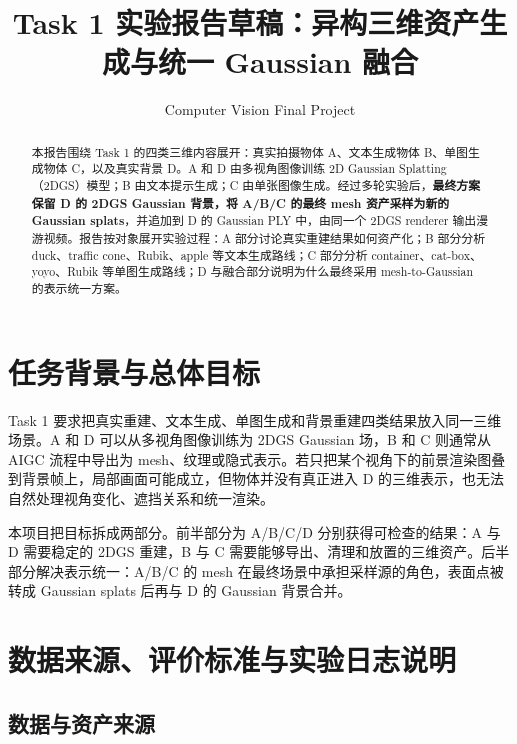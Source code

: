\documentclass[UTF8,10pt,a4paper]{ctexart}
\title{\vspace{-1.0em}\textbf{Task 1 实验报告草稿：异构三维资产生成与统一 Gaussian 融合}}
\author{Computer Vision Final Project}
\date{\vspace{-1.5em}}
\begin{document}
\maketitle
\vspace{-1.0em}


\begin{abstract}
本报告围绕 Task 1 的四类三维内容展开：真实拍摄物体 A、文本生成物体 B、单图生成物体 C，以及真实背景 D。A 和 D 由多视角图像训练 2D Gaussian Splatting（2DGS）模型；B 由文本提示生成；C 由单张图像生成。经过多轮实验后，\textbf{最终方案保留 D 的 2DGS Gaussian 背景，将 A/B/C 的最终 mesh 资产采样为新的 Gaussian splats}，并追加到 D 的 Gaussian PLY 中，由同一个 2DGS renderer 输出漫游视频。报告按对象展开实验过程：A 部分讨论真实重建结果如何资产化；B 部分分析 duck、traffic cone、Rubik、apple 等文本生成路线；C 部分分析 container、cat-box、yoyo、Rubik 等单图生成路线；D 与融合部分说明为什么最终采用 mesh-to-Gaussian 的表示统一方案。
\end{abstract}

\section{任务背景与总体目标}

Task 1 要求把真实重建、文本生成、单图生成和背景重建四类结果放入同一三维场景。A 和 D 可以从多视角图像训练为 2DGS Gaussian 场，B 和 C 则通常从 AIGC 流程中导出为 mesh、纹理或隐式表示。若只把某个视角下的前景渲染图叠到背景帧上，局部画面可能成立，但物体并没有真正进入 D 的三维表示，也无法自然处理视角变化、遮挡关系和统一渲染。

本项目把目标拆成两部分。前半部分为 A/B/C/D 分别获得可检查的结果：A 与 D 需要稳定的 2DGS 重建，B 与 C 需要能够导出、清理和放置的三维资产。后半部分解决表示统一：A/B/C 的 mesh 在最终场景中承担采样源的角色，表面点被转成 Gaussian splats 后再与 D 的 Gaussian 背景合并。

\section{数据来源、评价标准与实验日志说明}

\subsection{数据与资产来源}
\end{document}

